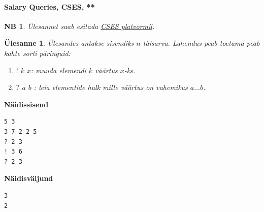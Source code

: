 \documentclass{trkut}
\newtheorem*{extra}{NB}
\newtheorem*{Text}{Ülesanne}
\begin{document}
\paragraph{Salary Queries, CSES, **}
\begin{extra}
Ülesannet saab esitada \href{https://cses.fi/problemset/task/1144}{CSES platvormil}.
\end{extra}
\begin{Text}
Ülesandes antakse sisendiks $n$ täisarvu.
Lahendus peab toetama peab kahte sorti päringuid:
\begin{enumerate}
\item $!$ $k$ $x$: muuda elemendi $k$ väärtus $x$-ks.

\item $?$ $a$ $b$ : leia elementide hulk mille väärtus on vahemikus $a…b$.
\end{enumerate}

\parencite{salary}
\end{Text}



\textbf{Näidissisend}

\begin{verbatim}
5 3
3 7 2 2 5
? 2 3
! 3 6
? 2 3
\end{verbatim}

\textbf{Näidisväljund}

\begin{verbatim}
3
2
\end{verbatim}
\end{document}
